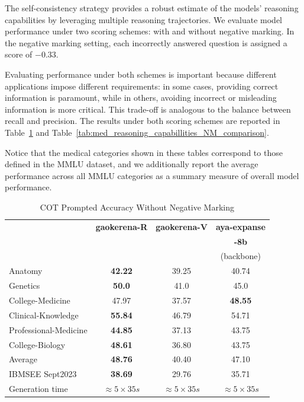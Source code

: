 \documentclass[conference]{IEEEtran}
\begin{document}
The self-consistency strategy provides a robust estimate of the models’ reasoning capabilities by leveraging multiple reasoning trajectories. We evaluate model performance under two scoring schemes: with and without negative marking. In the negative marking setting, each incorrectly answered question is assigned a score of \(-0.33\).

Evaluating performance under both schemes is important because different applications impose different requirements: in some cases, providing correct information is paramount, while in others, avoiding incorrect or misleading information is more critical. This trade-off is analogous to the balance between recall and precision. The results under both scoring schemes are reported in Table~\ref{tab:med_reasoning_capabillities_WNM_comparison} and Table~\ref{tab:med_reasoning_capabillities_NM_comparison}. 

Notice that the medical categories shown in these tables correspond to those defined in the MMLU dataset, and we additionally report the average performance across all MMLU categories as a summary measure of overall model performance.


	\begin{table}[ht]
		\centering
		\caption{COT Prompted Accuracy Without Negative Marking}
		\begin{tabular}{|l|c|c|c|}  
			\hline
			\textbf{} & \textbf{gaokerena-R} & \textbf{gaokerena-V} & \textbf{aya-expanse} \\ 
			&  &   & \textbf{-8b} \\
			&   & &(backbone)  \\ \hline
			Anatomy  & \textbf{42.22} & 39.25  & 40.74 \\ \hline
			Genetics & \textbf{50.0}  & 41.0  & 45.0 \\ \hline
			College-Medicine & 47.97  & 37.57  &\textbf{48.55}  \\ \hline
			Clinical-Knowledge& \textbf{55.84} & 46.79  & 54.71  \\ \hline
			Professional-Medicine& \textbf{44.85} & 37.13 & 43.75 \\
			College-Biology& \textbf{48.61} & 36.80 & 43.75 \\ \hline
			Average & \textbf{48.76} & 40.40 & 47.10 \\ \hline
			IBMSEE Sept2023 & \textbf{38.69}  & 29.76 & 35.71  \\ \hline
			Generation time & $\approx 5 \times 35s$ & $\approx 5 \times 35s$ & $\approx 5 \times 35s$ \\  \hline
		\end{tabular}
		\label{tab:med_reasoning_capabillities_WNM_comparison}
	\end{table}
\end{document}
